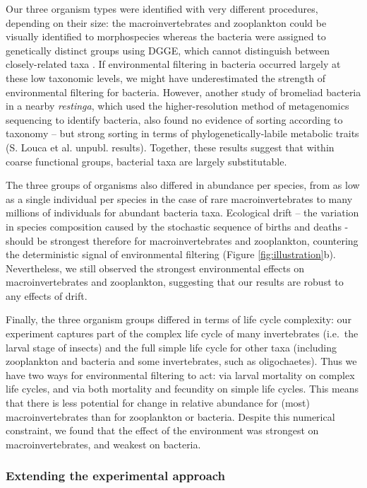 Our three organism types were identified with very different procedures,
depending on their size: the macroinvertebrates and zooplankton could be
visually identified to morphospecies whereas the bacteria were assigned
to genetically distinct groups using DGGE, which cannot distinguish
between closely-related taxa \citep{Wiedenbeck2011}. If environmental
filtering in bacteria occurred largely at these low taxonomic levels, we
might have underestimated the strength of environmental filtering for
bacteria. However, another study of bromeliad bacteria in a nearby
\emph{restinga}, which used the higher-resolution method of metagenomics
sequencing to identify bacteria, also found no evidence of sorting
according to taxonomy -- but strong sorting in terms of
phylogenetically-labile metabolic traits (S. Louca et al. unpubl.
results). Together, these results suggest that within coarse functional
groups, bacterial taxa are largely substitutable.

The three groups of organisms also differed in abundance per species,
from as low as a single individual per species in the case of rare
macroinvertebrates to many millions of individuals for abundant bacteria
taxa. Ecological drift -- the variation in species composition caused by
the stochastic sequence of births and deaths - should be strongest
therefore for macroinvertebrates and zooplankton, countering the
deterministic signal of environmental filtering (Figure \ref{fig:illustration}b).
Nevertheless, we still observed the strongest environmental effects on
macroinvertebrates and zooplankton, suggesting that our results are
robust to any effects of drift.

Finally, the three organism groups differed in terms of life cycle
complexity: our experiment captures part of the complex life cycle of
many invertebrates (i.e.~the larval stage of insects) and the full
simple life cycle for other taxa (including zooplankton and bacteria and
some invertebrates, such as oligochaetes). Thus we have two ways for
environmental filtering to act: via larval mortality on complex life
cycles, and via both mortality and fecundity on simple life cycles. This
means that there is less potential for change in relative abundance for
(most) macroinvertebrates than for zooplankton or bacteria. Despite this
numerical constraint, we found that the effect of the environment was
strongest on macroinvertebrates, and weakest on bacteria.

\subsubsection{Extending the experimental
approach}\label{extending-the-experimental-approach}

